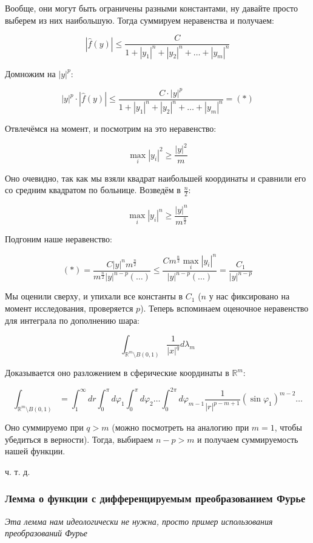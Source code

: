 \documentclass{article}
\begin{document}
Вообще, они могут быть ограничены разными константами, ну давайте просто выберем из них наибольшую. Тогда суммируем неравенства и получаем: 

\[|\hat{f}(y)| \le \frac{C}{1 + |y_1|^n + |y_2|^n + \ldots + |y_m|^n}\]

Домножим на $|y|^p$:

\[|y|^p \cdot |\hat{f}(y)| \le \frac{C \cdot |y|^p}{1 + |y_1|^n + |y_2|^n + \ldots + |y_m|^n} = (*)\]

Отвлечёмся на момент, и посмотрим на это неравенство:

\[\max_{i} |y_i|^2 \ge \frac{|y|^2}{m}\]

Оно очевидно, так как мы взяли квадрат наибольшей координаты и сравнили его со средним квадратом по больнице. Возведём в $\frac{n}{2}$:

\[\max_{i} |y_i|^n \ge \frac{|y|^n}{m^{\frac{n}{2}}}\]

Подгоним наше неравенство:

\[(*) = \frac{C |y|^n m^{\frac{n}{2}}}{m^{\frac{n}{2}}|y|^{n - p} (\ldots)} \le \frac{Cm^{\frac{n}{2}}\max_{i}|y_i|^n}{|y|^{n - p}(\ldots)} = \frac{C_1}{|y|^{n - p}}\]

Мы оценили сверху, и упихали все константы в $C_1$ ($n$ у нас фиксировано на момент исследования, проверяется $p$). Теперь вспоминаем оценочное неравенство для интеграла по дополнению шара:

\[\int_{\mathbb{R}^m \setminus B(0, 1)} \frac{1}{|x|^q} d\lambda_m\]

Доказывается оно разложением в сферические координаты в $\mathbb{R}^m$:

\[\int_{\mathbb{R}^m \setminus B(0, 1)} = \int_{1}^{\infty} dr \int_{0}^{\pi} d\varphi_1\int_{0}^{\pi} d\varphi_2\ldots\int_{0}^{2\pi} d\varphi_{m - 1} \frac{1}{|r|^{p - m + 1}}(\sin \varphi_{1})^{m - 2} \ldots \]

Оно суммируемо при $q > m$ (можно посмотреть на аналогию при $m = 1$, чтобы убедиться в верности). Тогда, выбираем $n - p > m$ и получаем суммируемость нашей функции.

ч. т. д. 


\subsubsection{Лемма о функции с дифференцируемым преобразованием Фурье}

\textit{Эта лемма нам идеологически не нужна, просто пример использования преобразований Фурье}
\end{document}
